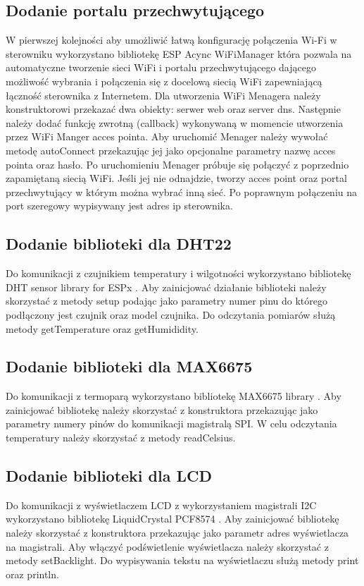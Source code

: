 \documentclass[11pt]{report}
\begin{document}
  \subsection{Dodanie portalu przechwytującego}
 W pierwszej kolejności aby umożliwić łatwą konfigurację połączenia Wi-Fi w sterowniku wykorzystano bibliotekę ESP Acync WiFiManager \cite{WiFiManager} która pozwala na automatyczne tworzenie sieci WiFi i portalu przechwytującego dającego możliwość wybrania i połączenia się z docelową siecią WiFi zapewniającą łączność sterownika z Internetem. 
 Dla utworzenia  WiFi Menagera należy konstruktorowi przekazać dwa obiekty: serwer web oraz server dns. Następnie należy dodać funkcję zwrotną (callback) wykonywaną w momencie utworzenia przez WiFi Manger acces pointa. Aby uruchomić Menager należy wywołać metodę autoConnect przekazując jej jako opcjonalne parametry nazwę acces pointa oraz hasło. Po uruchomieniu Menager próbuje się połączyć z poprzednio zapamiętaną siecią WiFi. Jeśli jej nie odnajdzie, tworzy acces point oraz portal przechwytujący w którym można wybrać inną sieć. Po poprawnym połączeniu na port szeregowy wypisywany jest adres ip sterownika.
 \subsection{Dodanie biblioteki dla DHT22}
 Do komunikacji z czujnikiem temperatury i wilgotności wykorzystano bibliotekę DHT sensor library for ESPx \cite{DHTlibrary}. Aby zainicjować działanie biblioteki należy skorzystać z metody setup podając jako parametry numer pinu do którego podłączony jest czujnik oraz model czujnika. Do odczytania pomiarów służą metody getTemperature oraz getHumididity.
 \subsection{Dodanie biblioteki dla MAX6675}
 Do komunikacji z termoparą wykorzystano bibliotekę MAX6675 library \cite{MAX6675library}. Aby zainicjować bibliotekę należy skorzystać z konstruktora przekazując jako parametry numery pinów do komunikacji magistralą SPI.
 W celu odczytania temperatury należy skorzystać z metody readCelsius.
 \subsection{Dodanie biblioteki dla LCD}
 Do komunikacji z wyświetlaczem LCD z wykorzystaniem magistrali I2C wykorzystano bibliotekę LiquidCrystal PCF8574 \cite{LCDlibrary}. Aby zainicjować bibliotekę należy skorzystać z konstruktora przekazując jako parametr adres wyświetlacza na magistrali. Aby włączyć podświetlenie wyświetlacza należy skorzystać z metody setBacklight. Do wypisywania tekstu na wyświetlaczu służą metody print oraz println.
\end{document}
